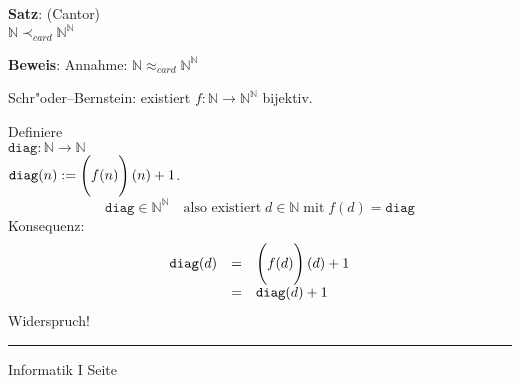 \begin{slide}{}
\normalsize
\textbf{Satz}: (Cantor) \\[0.3cm]
\hspace*{1.3cm} $\mathbb{N} \prec_{card} \mathbb{N}^\mathbb{N}$
\vspace{0.5cm}

\footnotesize
\textbf{Beweis}:
Annahme: $\mathbb{N} \approx_{card} \mathbb{N}^\mathbb{N}$

Schr"oder--Bernstein: existiert $f:\mathbb{N} \rightarrow \mathbb{N}^\mathbb{N}$ bijektiv.

Definiere\\[0.3cm]
\hspace*{1.3cm}  $\mathtt{diag}: \mathbb{N} \rightarrow \mathbb{N}$ \\[0.3cm]
\hspace*{1.3cm}  $\mathtt{diag}(n) := \left(\rule{0pt}{16pt}f(n)\right)(n) + 1$.\\[0.3cm]
$$ \mathtt{diag} \in \mathbb{N}^\mathbb{N} \quad 
      \mbox{also existiert}\; d \in \mathbb{N}\; \mbox{mit}\; f(d) = \mathtt{diag} $$
Konsequenz: 
$$ 
\begin{array}{lcl}
 \texttt{diag}(d) & = & \left(\rule{0pt}{16pt}f(d)\right)(d) + 1 \\
           & = & \texttt{diag}(d) + 1
\end{array}
$$        
Widerspruch!
      
\begin{center}
\end{center}

\vspace*{\fill}
\tiny \addtocounter{mypage}{1}
\rule{15cm}{1mm}
Informatik I  \hspace*{\fill} Seite 
\end{slide}


